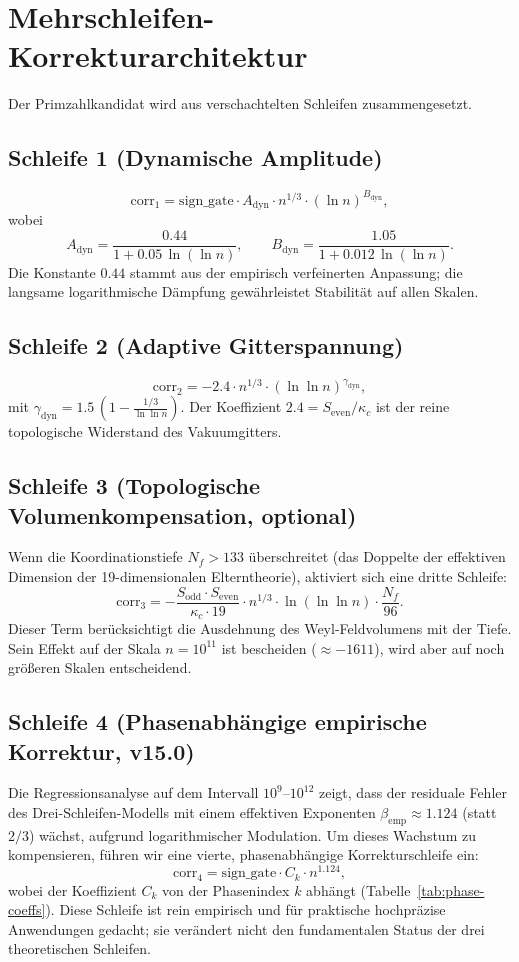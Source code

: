 \documentclass[11pt,a4paper]{article}
\newcommand{\kappac}{\kappa_c}
\newcommand{\Sodd}{S_{\mathrm{odd}}}
\newcommand{\Seven}{S_{\mathrm{even}}}
\begin{document}
	\section{Mehrschleifen-Korrekturarchitektur}
	\label{sec:multiloop}
	Der Primzahlkandidat wird aus verschachtelten Schleifen zusammengesetzt.
	
	\subsection{Schleife 1 (Dynamische Amplitude)}
	\[
	\mathrm{corr}_1 = \mathrm{sign\_gate} \cdot A_{\mathrm{dyn}} \cdot n^{1/3} \cdot (\ln n)^{B_{\mathrm{dyn}}},
	\]
	wobei
	\[
	A_{\mathrm{dyn}} = \frac{0.44}{1 + 0.05\,\ln(\ln n)}, \qquad
	B_{\mathrm{dyn}} = \frac{1.05}{1 + 0.012\,\ln(\ln n)}.
	\]
	Die Konstante \(0.44\) stammt aus der empirisch verfeinerten Anpassung; die langsame logarithmische Dämpfung gewährleistet Stabilität auf allen Skalen.
	
	\subsection{Schleife 2 (Adaptive Gitterspannung)}
	\[
	\mathrm{corr}_2 = -2.4 \cdot n^{1/3} \cdot (\ln\ln n)^{\gamma_{\mathrm{dyn}}},
	\]
	mit \(\gamma_{\mathrm{dyn}} = 1.5\,(1 - \frac{1/3}{\ln\ln n})\). Der Koeffizient \(2.4 = \Seven/\kappac\) ist der reine topologische Widerstand des Vakuumgitters.
	
	\subsection{Schleife 3 (Topologische Volumenkompensation, optional)}
	Wenn die Koordinationstiefe \(N_f > 133\) überschreitet (das Doppelte der effektiven Dimension der 19-dimensionalen Elterntheorie), aktiviert sich eine dritte Schleife:
	\[
	\mathrm{corr}_3 = -\frac{\Sodd\cdot\Seven}{\kappac\cdot 19} \cdot n^{1/3} \cdot \ln(\ln\ln n) \cdot \frac{N_f}{96}.
	\]
	Dieser Term berücksichtigt die Ausdehnung des Weyl-Feldvolumens mit der Tiefe. Sein Effekt auf der Skala \(n=10^{11}\) ist bescheiden (\(\approx -1611\)), wird aber auf noch größeren Skalen entscheidend.
	
	\subsection{Schleife 4 (Phasenabhängige empirische Korrektur, v15.0)}
	Die Regressionsanalyse auf dem Intervall \(10^9\)--\(10^{12}\) zeigt, dass der residuale Fehler des Drei-Schleifen-Modells mit einem effektiven Exponenten \(\beta_{\mathrm{emp}} \approx 1.124\) (statt \(2/3\)) wächst, aufgrund logarithmischer Modulation. Um dieses Wachstum zu kompensieren, führen wir eine vierte, phasenabhängige Korrekturschleife ein:
	\[
	\mathrm{corr}_4 = \mathrm{sign\_gate} \cdot C_k \cdot n^{1.124},
	\]
	wobei der Koeffizient \(C_k\) von der Phasenindex \(k\) abhängt (Tabelle~\ref{tab:phase-coeffs}). Diese Schleife ist rein empirisch und für praktische hochpräzise Anwendungen gedacht; sie verändert nicht den fundamentalen Status der drei theoretischen Schleifen.
	
\end{document}
